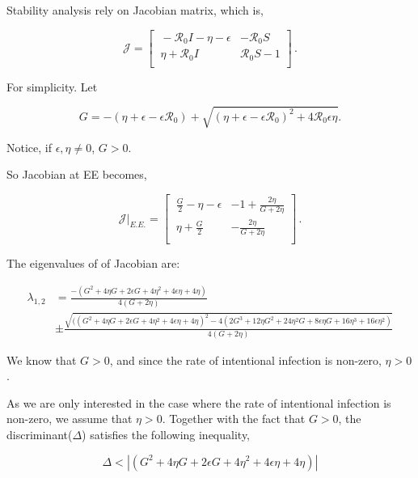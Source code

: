 \documentclass[12pt]{article}
\newcommand{\R}{\mathcal{R}}
\begin{document}
Stability analysis rely on Jacobian matrix, which is,
\begin{linenomath*}
\begin{equation}
\mathcal{J} =
\begin{bmatrix}
    \ -\R_0 I-\eta-\epsilon       & -\R_0 S \\
    \ \eta+\R_0 I       & \R_0 S-1 \\
\end{bmatrix}\,.
\end{equation}
\end{linenomath*}

For simplicity. Let 
\begin{linenomath*}
\begin{equation}
G=-(\eta+\epsilon-\epsilon\R_0)+\sqrt{(\eta+\epsilon-\epsilon\R_0)^2+4\R_0\epsilon \eta}.
\end{equation}
\end{linenomath*}
Notice, if $\epsilon,\eta\neq 0$, $G>0$. 

So Jacobian at EE becomes,
\begin{linenomath*}
\begin{equation}
\mathcal{J}|_{E.E.}=
\begin{bmatrix}
    \ \frac{G}{2}-\eta-\epsilon       & -1+\frac{2\eta}{G+2\eta} \\
    \ \eta+\frac{G}{2}       & -\frac{2\eta}{G+2\eta} \\
\end{bmatrix}\,.
\end{equation}
\end{linenomath*}

The eigenvalues of of Jacobian are:

\begin{linenomath*}
\begin{align}
\lambda_{1,2} &= \frac{-(G^2+4\eta G+2\epsilon G+4\eta^2+4\epsilon\eta+4\eta) }{4(G+2\eta)}\\
& \pm \frac{\sqrt{((G^2+4\eta G+2\epsilon G+4\eta^2+4\epsilon\eta+4\eta)^2-4(2G^3+12\eta G^2+24\eta^2 G+8\epsilon\eta G+16\eta^3+16\epsilon\eta^2)}}{4(G+2\eta)}
\end{align}
\end{linenomath*}

We know that $G>0$, and since the rate of intentional infection is non-zero, $\eta >0$.

As we are only interested in the case where the rate of intentional infection is non-zero, we assume that $\eta>0$. Together with the fact that $G>0$, the discriminant($\Delta$) satisfies the following inequality,
\begin{linenomath*}
\begin{equation}
\Delta<|(G^2+4\eta G+2\epsilon G+4\eta^2+4\epsilon\eta+4\eta)|
\end{equation}
\end{linenomath*}
\end{document}
